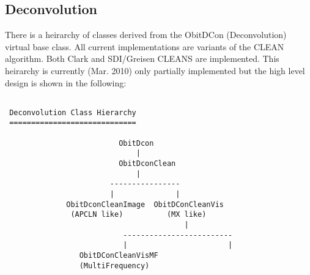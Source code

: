 \documentclass[11pt]{article}
\begin{document}
\subsection{Deconvolution}
   There is a heirarchy of classes derived from the ObitDCon
(Deconvolution) virtual base class.
All current implementations are variants of the CLEAN algorithm.
Both Clark and SDI/Greisen CLEANS are implemented.
This heirarchy is currently (Mar. 2010) only partially implemented but
the high level design is shown in the following:

\begin{verbatim}

 Deconvolution Class Hierarchy
 =============================

                          ObitDcon
                              |
                          ObitDconClean
                              |
                        ----------------
                        |              |
              ObitDconCleanImage  ObitDConCleanVis
               (APCLN like)          (MX like)
                                         |
                           -------------------------
                           |                       |
                 ObitDConCleanVisMF        
                 (MultiFrequency)             

\end{verbatim}
\end{document}
